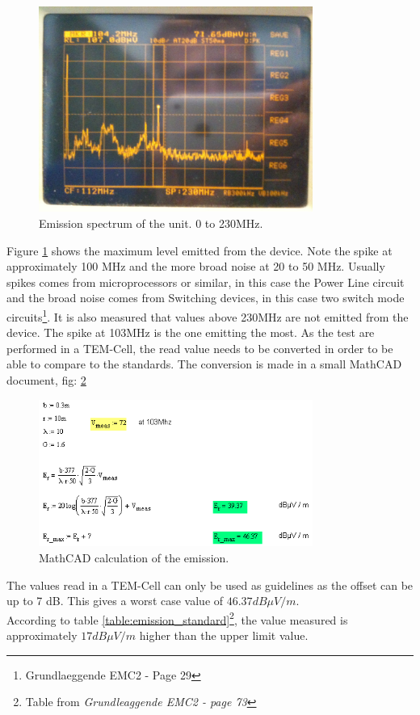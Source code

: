\begin{figure}[H]
	\begin{centering}
		 \includegraphics[width=0.8\textwidth]{images/measure_on.jpg}
		\caption{Emission spectrum of the unit. 0 to 230MHz.}
		\label{fig:spectrum_on}
	\end{centering}
\end{figure}
Figure \ref{fig:spectrum_on} shows the maximum level emitted from the device. Note the spike at approximately 100 MHz and the more broad noise at 20 to 50 MHz. Usually spikes comes from microprocessors or similar, in this case the Power Line circuit and the broad noise comes from Switching devices, in this case two switch mode circuits\footnote{Grundlaeggende EMC2 - Page 29}. It is also measured that values above 230MHz are not emitted from the device.
\p The spike at 103MHz is the one emitting the most. As the test are performed in a TEM-Cell, the read value needs to be converted in order to be able to compare to the standards. The conversion is made in a small MathCAD document, fig: \ref{fig:mathcad}
\begin{figure}[H]
	\begin{centering}
		 \includegraphics[width=0.8\textwidth]{images/mathcad_emission}
		\caption{MathCAD calculation of the emission.}
	\label{fig:mathcad}
	\end{centering}
\end{figure}
The values read in a TEM-Cell can only be used as guidelines as the offset can be up to 7 dB. This gives a worst case value of $ 46.37 dB\mu V/m$.
\\\p According to table \ref{table:emission_standard}\footnote{Table from \textit{Grundleaggende EMC2 - page 73}}, the value measured is approximately $17dB\mu V/m$ higher than the upper limit value.

